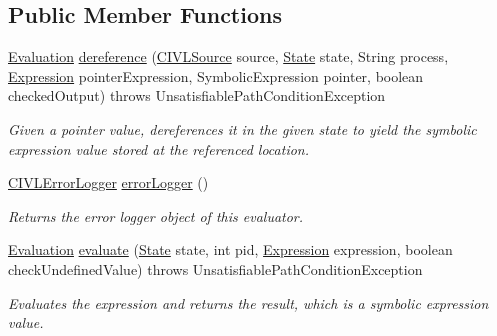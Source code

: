 \subsection*{Public Member Functions}
\begin{DoxyCompactItemize}
\item 
\hyperlink{classedu_1_1udel_1_1cis_1_1vsl_1_1civl_1_1semantics_1_1IF_1_1Evaluation}{Evaluation} \hyperlink{interfaceedu_1_1udel_1_1cis_1_1vsl_1_1civl_1_1semantics_1_1IF_1_1Evaluator_a7d053e0a012c65e8c285b55d69d0d1cb}{dereference} (\hyperlink{interfaceedu_1_1udel_1_1cis_1_1vsl_1_1civl_1_1model_1_1IF_1_1CIVLSource}{C\+I\+V\+L\+Source} source, \hyperlink{interfaceedu_1_1udel_1_1cis_1_1vsl_1_1civl_1_1state_1_1IF_1_1State}{State} state, String process, \hyperlink{interfaceedu_1_1udel_1_1cis_1_1vsl_1_1civl_1_1model_1_1IF_1_1expression_1_1Expression}{Expression} pointer\+Expression, Symbolic\+Expression pointer, boolean checked\+Output)  throws Unsatisfiable\+Path\+Condition\+Exception
\begin{DoxyCompactList}\small\item\em Given a pointer value, dereferences it in the given state to yield the symbolic expression value stored at the referenced location. \end{DoxyCompactList}\item 
\hyperlink{classedu_1_1udel_1_1cis_1_1vsl_1_1civl_1_1log_1_1IF_1_1CIVLErrorLogger}{C\+I\+V\+L\+Error\+Logger} \hyperlink{interfaceedu_1_1udel_1_1cis_1_1vsl_1_1civl_1_1semantics_1_1IF_1_1Evaluator_aebbf366a34283a80cf1b6ec599fc7b47}{error\+Logger} ()
\begin{DoxyCompactList}\small\item\em Returns the error logger object of this evaluator. \end{DoxyCompactList}\item 
\hyperlink{classedu_1_1udel_1_1cis_1_1vsl_1_1civl_1_1semantics_1_1IF_1_1Evaluation}{Evaluation} \hyperlink{interfaceedu_1_1udel_1_1cis_1_1vsl_1_1civl_1_1semantics_1_1IF_1_1Evaluator_af2a23ba023164864718980818e53568a}{evaluate} (\hyperlink{interfaceedu_1_1udel_1_1cis_1_1vsl_1_1civl_1_1state_1_1IF_1_1State}{State} state, int pid, \hyperlink{interfaceedu_1_1udel_1_1cis_1_1vsl_1_1civl_1_1model_1_1IF_1_1expression_1_1Expression}{Expression} expression, boolean check\+Undefined\+Value)  throws Unsatisfiable\+Path\+Condition\+Exception
\begin{DoxyCompactList}\small\item\em Evaluates the expression and returns the result, which is a symbolic expression value. \end{DoxyCompactList}\item 

\end{DoxyCompactItemize}

